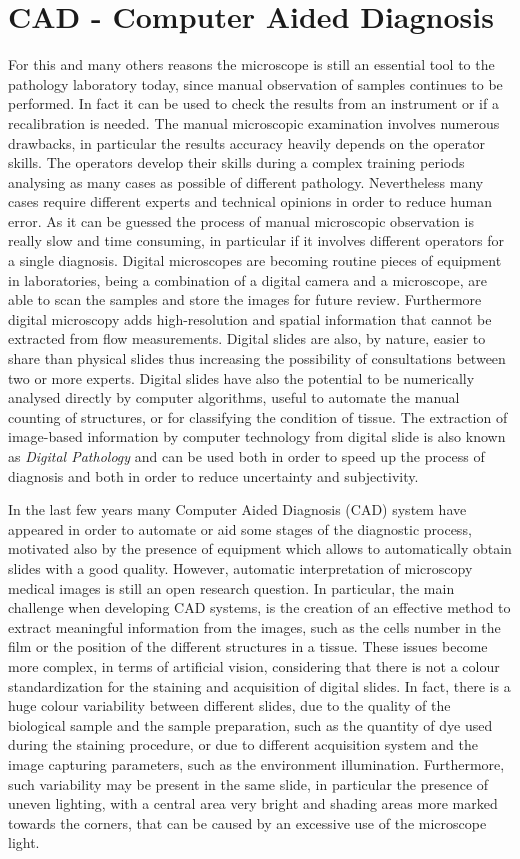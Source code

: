 \documentclass[final,a4paper,12pt,english]{UnicaPhdThesis3}
\begin{document}
\section{CAD - Computer Aided Diagnosis}
For this and many others reasons the microscope is still an essential tool to the pathology laboratory today, since manual observation of samples continues to be performed. In fact it can be used to check the results from an instrument or if a recalibration is needed. The manual microscopic examination involves numerous drawbacks, in particular the results accuracy heavily depends on the operator skills. The operators develop their skills during a complex training periods analysing as many cases as possible of different pathology. Nevertheless many cases require different experts and technical opinions in order to reduce human error. As it can be guessed the process of manual microscopic observation is really slow and time consuming, in particular if it involves different operators for a single diagnosis. Digital microscopes are becoming routine pieces of equipment in laboratories, being a combination of a digital camera and a microscope, are able to scan the samples and store the images for future review. Furthermore digital microscopy adds high-resolution and spatial information that cannot be extracted from flow measurements. Digital slides are also, by nature, easier to share than physical slides thus increasing the possibility of consultations between two or more experts. Digital slides have also the potential to be numerically analysed directly by computer algorithms, useful to automate the manual counting of structures, or for classifying the condition of tissue. The extraction of image-based information by computer technology from digital slide is also known as \textit{Digital Pathology} and can be used both in order to speed up the process of diagnosis and both in order to reduce uncertainty and subjectivity.

In the last few years many Computer Aided Diagnosis (\acs{CAD}) system have appeared in order to automate or aid some stages of the diagnostic process, motivated also by the presence of equipment which allows to automatically obtain slides with a good quality. However, automatic interpretation of microscopy medical images is still an open research question. In particular, the main challenge when developing CAD systems, is the creation of an effective method to extract meaningful information from the images, such as the cells number in the film or the position of the different structures in a tissue. These issues become more complex, in terms of artificial vision, considering that there is not a colour standardization for the staining and acquisition of digital slides. In fact, there is a huge colour variability between different slides, due to the quality of the biological sample and the sample preparation, such as the quantity of dye used during the staining procedure, or due to different acquisition system and the image capturing parameters, such as the environment illumination. Furthermore, such variability may be present in the same slide, in particular the presence of uneven lighting, with a central area very bright and shading areas more marked towards the corners, that can be caused by an excessive use of the microscope light.
\end{document}
